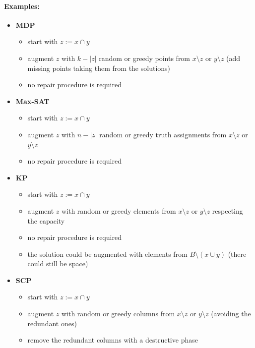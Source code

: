 \documentclass[11pt]{article}
\begin{document}
	\paragraph{Examples:}
	\begin{itemize}
		\item \textbf{MDP}
		\begin{itemize}
			\item start with $z := x \cap y$
			\item augment $z$ with $k - |z|$ random or greedy points from $x \setminus z$ or $y \setminus z$ (add missing points taking them from the solutions)
			\item no repair procedure is required
		\end{itemize}
		\nn
		
		\item \textbf{Max-SAT}
		\begin{itemize}
			\item start with $z := x \cap y$
			\item augment $z$ with $n - |z|$ random or greedy truth assignments from $x \setminus z$ or $y \setminus z$ 
			\item no repair procedure is required
		\end{itemize}
		\nn
		
		\item \textbf{KP}
		\begin{itemize}
			\item start with $z := x \cap y$
			\item augment $z$ with random or greedy elements from $x \setminus z$ or $y \setminus z$ respecting the capacity
			\item no repair procedure is required
			\item the solution could be augmented with elements from $B \setminus (x \cup y)$ (there could still be space)
		\end{itemize}
		\nn
		
		\item \textbf{SCP}
		\begin{itemize}
			\item start with $z := x \cap y$
			\item augment $z$ with random or greedy columns from $x \setminus z$ or $y \setminus z$ (avoiding the redundant ones)
			\item remove the redundant columns with a destructive phase
		\end{itemize}
		\nn
	\end{itemize}
	
\end{document}
